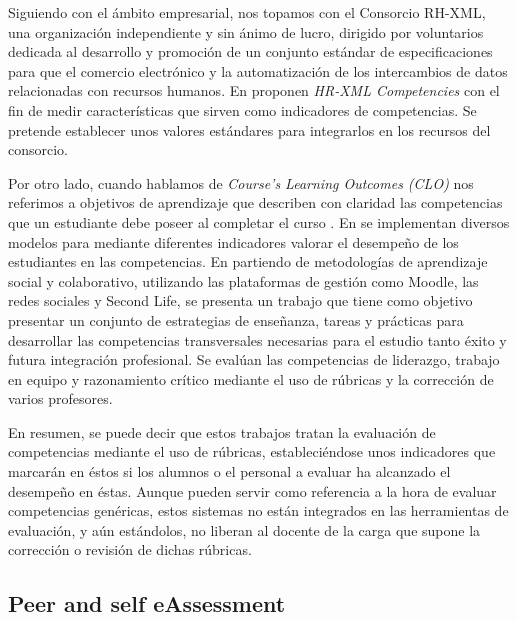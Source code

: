 Siguiendo con el ámbito empresarial, nos topamos con el Consorcio RH-XML, una organización independiente y sin ánimo de lucro, dirigido por voluntarios dedicada al desarrollo y promoción de un conjunto estándar de especificaciones para que el comercio electrónico y la automatización de los intercambios de datos relacionadas con recursos humanos. En \cite{Adelsberger:2008} proponen \emph{HR-XML Competencies} con el fin de medir características que sirven como indicadores de competencias. Se pretende establecer unos valores estándares para integrarlos en los recursos del consorcio.

Por otro lado, cuando hablamos de \emph{Course’s Learning Outcomes (CLO)} nos referimos a objetivos de aprendizaje que describen con claridad las competencias que un estudiante debe poseer al completar el curso \cite{SimonTaylor:2009, Anderson:2001,Kennedy:2007}. En \cite {Mohamed:2008,Mohamed:2008a,Rashid:2008} se implementan diversos modelos para mediante diferentes indicadores valorar el desempeño de los estudiantes en las competencias. En \cite{MercedesRico:2013} partiendo de metodologías de aprendizaje social y colaborativo, utilizando las plataformas de gestión como Moodle, las redes sociales y Second Life, se presenta un trabajo que tiene como objetivo presentar un conjunto de estrategias de enseñanza, tareas y prácticas para desarrollar las competencias transversales necesarias para el estudio tanto éxito y futura integración profesional. Se evalúan las competencias de liderazgo, trabajo en equipo y razonamiento crítico mediante el uso de rúbricas y la corrección de varios profesores.

En resumen, se puede decir que estos trabajos tratan la evaluación de competencias mediante el uso de rúbricas, estableciéndose unos indicadores que marcarán en éstos si los alumnos o el personal a evaluar ha alcanzado el desempeño en éstas. Aunque pueden servir como referencia a la hora de evaluar competencias genéricas, estos sistemas no están integrados en las herramientas de evaluación, y aún estándolos, no liberan al docente de la carga que supone la corrección o revisión de dichas rúbricas.

\subsection{Peer and self eAssessment}

